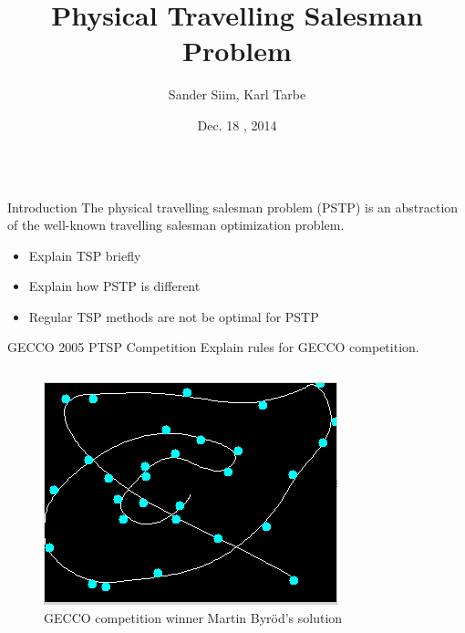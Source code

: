 \documentclass[final,t]{beamer}
\title{\huge Physical Travelling Salesman Problem}
\author{Sander Siim, Karl Tarbe}
\institute[University of Tartu]{Institute of Computer Science, University of Tartu, Tartu, Estonia}
\date[Dec. 18 , 2014]{Dec. 18 , 2014}
\begin{document}
\begin{frame}{} 
  \begin{columns}[t]
    \begin{column}{.3\linewidth}


      \begin{block}{Introduction}
        The \alert{physical travelling salesman problem} (PSTP) is an abstraction of the well-known travelling salesman optimization problem.
        \begin{itemize}
        \item Explain TSP briefly
        \item Explain how PSTP is different
        \item Regular TSP methods are not be optimal for PSTP
        \end{itemize}
      \end{block}

      
      \begin{block}{GECCO 2005 PTSP Competition}
        Explain rules for GECCO competition. 
        \begin{columns}[T]
          \begin{column}{.55\linewidth} 
            \begin{figure}
              \centering
              \includegraphics[width=\linewidth]{byrod_solution.png}          
              \caption{GECCO competition winner Martin Byr\"{o}d's solution}
            \end{figure}
          \end{column}


\end{columns}
\end{block}
\end{column}
\end{columns}
\end{frame}
\end{document}
